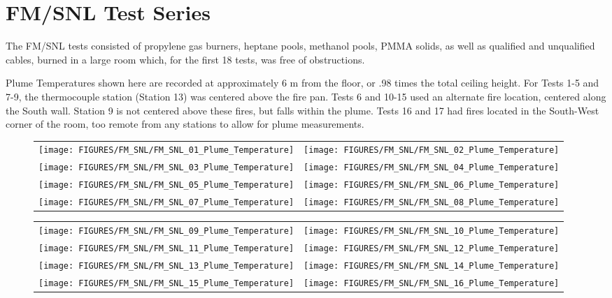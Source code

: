 \newpage

\section{FM/SNL Test Series}

\label{FM/SNL_Plume}

The FM/SNL tests consisted of propylene gas burners, heptane pools, methanol pools, PMMA solids, as well as qualified and unqualified cables, burned in a large room which, for the first 18 tests, was free of obstructions.

Plume Temperatures shown here are recorded at approximately 6 m from the floor, or .98 times the total ceiling height. For Tests 1-5 and 7-9, the thermocouple station (Station 13) was centered above the fire pan. Tests 6 and 10-15 used an alternate fire location, centered along the South wall. Station 9 is not centered above these fires, but falls within the plume. Tests 16 and 17 had fires located in the South-West corner of the room, too remote from any stations to allow for plume measurements.

\begin{figure}[p]
\begin{tabular*}{\textwidth}{l@{\extracolsep{\fill}}r}
\texttt{[image: FIGURES/FM\_SNL/FM\_SNL\_01\_Plume\_Temperature]} &
\texttt{[image: FIGURES/FM\_SNL/FM\_SNL\_02\_Plume\_Temperature]} \\
\texttt{[image: FIGURES/FM\_SNL/FM\_SNL\_03\_Plume\_Temperature]} &
\texttt{[image: FIGURES/FM\_SNL/FM\_SNL\_04\_Plume\_Temperature]} \\
\texttt{[image: FIGURES/FM\_SNL/FM\_SNL\_05\_Plume\_Temperature]} &
\texttt{[image: FIGURES/FM\_SNL/FM\_SNL\_06\_Plume\_Temperature]} \\
\texttt{[image: FIGURES/FM\_SNL/FM\_SNL\_07\_Plume\_Temperature]} &
\texttt{[image: FIGURES/FM\_SNL/FM\_SNL\_08\_Plume\_Temperature]}
\end{tabular*}
\label{FM_SNL_Plume_1}
\end{figure}

\begin{figure}[p]
\begin{tabular*}{\textwidth}{l@{\extracolsep{\fill}}r}
\texttt{[image: FIGURES/FM\_SNL/FM\_SNL\_09\_Plume\_Temperature]} &
\texttt{[image: FIGURES/FM\_SNL/FM\_SNL\_10\_Plume\_Temperature]} \\
\texttt{[image: FIGURES/FM\_SNL/FM\_SNL\_11\_Plume\_Temperature]} &
\texttt{[image: FIGURES/FM\_SNL/FM\_SNL\_12\_Plume\_Temperature]} \\
\texttt{[image: FIGURES/FM\_SNL/FM\_SNL\_13\_Plume\_Temperature]} &
\texttt{[image: FIGURES/FM\_SNL/FM\_SNL\_14\_Plume\_Temperature]} \\
\texttt{[image: FIGURES/FM\_SNL/FM\_SNL\_15\_Plume\_Temperature]} &
\texttt{[image: FIGURES/FM\_SNL/FM\_SNL\_16\_Plume\_Temperature]}
\end{tabular*}
\label{FM_SNL_Plume_2}
\end{figure}

